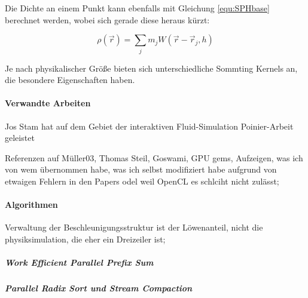 		Die Dichte an einem Punkt kann ebenfalls mit Gleichung \ref{equ:SPHbase} berechnet werden, wobei sich 
		gerade diese heraus kürzt:
		
		\begin{equation} \label{equ:SPHbase}
			\rho (\vec{r}) = \sum_j m_j  W(\vec{r}-\vec{r}_j,h)
		\end{equation}
		
		Je nach physikalischer Größe bieten sich unterschiedliche Sommting Kernels an, die besondere
		Eigenschaften haben.		
		


		
		
	\paragraph{Verwandte Arbeiten}
	\label{sec:relatedWork}

	Jos Stam \cite{Stam99stablefluids,Stam03realtimefluid} hat auf dem Gebiet der interaktiven Fluid-Simulation 
	Poinier-Arbeit geleistet 
	
	Referenzen auf Müller03, Thomas Steil, Goswami, GPU gems, Aufzeigen, was ich von wem übernommen habe, was ich selbst  
	modifiziert habe aufgrund von etwaigen Fehlern in den Papers odel weil OpenCL es schlciht nicht zulässt;
	

	\paragraph{Algorithmen}
	Verwaltung der Beschleunigungsstruktur ist der Löwenanteil, nicht die physiksimulation, die eher ein Dreizeiler 
	ist;
		\subparagraph{Work Efficient Parallel Prefix Sum}
		
		\subparagraph{Parallel Radix Sort und Stream Compaction}
		
